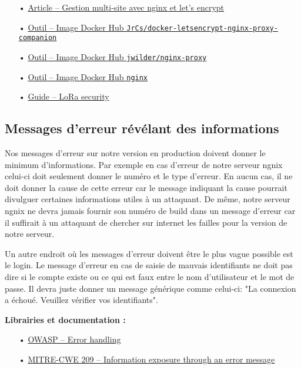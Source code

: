\begin{itemize}
\item[•] \href{https://meta.discourse.org/t/help-multisite-with-letsencrypt-nginx-proxy-companion/88192}{Article -- Gestion multi-site avec nginx et let's encrypt}
\item[•] \href{https://github.com/JrCs/docker-letsencrypt-nginx-proxy-companion}{Outil -- Image Docker Hub \texttt{JrCs/docker-letsencrypt-nginx-proxy-companion}}
\item[•] \href{https://github.com/jwilder/nginx-proxy}{Outil -- Image Docker Hub \texttt{jwilder/nginx-proxy}}
\item[•] \href{https://hub.docker.com/_/nginx/}{Outil -- Image Docker Hub \texttt{nginx}}
\item[•] \href{https://labs.mwrinfosecurity.com/assets/BlogFiles/mwri-LoRa-security-guide-1.2-2016-03-22.pdf}{Guide -- LoRa security}
\end{itemize}

\subsection{Messages d'erreur révélant des informations}
\label{ssec:cm-messageserreurs}

Nos messages d'erreur sur notre version en production doivent donner le minimum d'informations. Par exemple en cas d'erreur de notre serveur ngnix celui-ci doit seulement donner le numéro et le type d'erreur. En aucun cas, il ne doit donner la cause de cette erreur car le message indiquant la cause pourrait divulguer certaines informations utiles à un attaquant. De même, notre serveur ngnix ne devra jamais fournir son numéro de build dans un message d'erreur car il suffirait à un attaquant de chercher sur internet les failles pour la version de notre serveur. 

Un autre endroit où les messages d'erreur doivent être le plus vague possible est le login. Le message d'erreur en cas de saisie de mauvais identifiants ne doit pas dire si le compte existe ou ce qui est faux entre le nom d'utilisateur et le mot de passe. Il devra juste donner un message générique comme celui-ci: "La connexion a échoué. Veuillez vérifier vos identifiants".

\medskip
\textbf{Librairies et documentation :}

\begin{itemize}
\item[•] \href{https://www.owasp.org/index.php/Error_Handling}{OWASP -- Error handling}
\item[•] \href{https://cwe.mitre.org/data/definitions/209.html}{MITRE-CWE 209 -- Information exposure through an error message}
\end{itemize}

